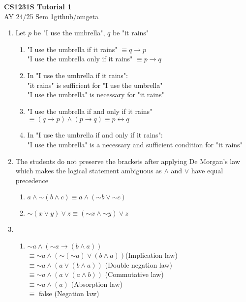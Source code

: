 \documentclass[12pt, a4paper]{article}
\newcommand{\mytitle}{CS1231S Tutorial 1}
\newcommand{\myauthor}{github/omgeta}
\newcommand{\mydate}{AY 24/25 Sem 1}
\begin{document}
\raggedright
\footnotesize
\begin{center}
{\normalsize{\textbf{\mytitle}}} \\
{\footnotesize{\mydate\hspace{2pt}\textemdash\hspace{2pt}\myauthor}}
\end{center}
\renewcommand{\neg}{\mathord{\sim}}
\begin{enumerate}[Q\arabic*.]
  \item Let $p$ be "I use the umbrella", $q$ be "it rains"
  \begin{enumerate}[(\alph*)]
    \item "I use the umbrella if it rains" $\equiv q \rightarrow p$ \\
      "I use the umbrella only if it rains" $\equiv p \rightarrow q$
    \item In "I use the umbrella if it rains": \\
      "it rains" is sufficient for "I use the umbrella" \\
      "I use the umbrella" is necessary for "it rains"
    \item "I use the umbrella if and only if it rains"$\equiv (q \rightarrow p) \land (p \rightarrow q) \equiv p \leftrightarrow q$
    \item In "I use the umbrella if and only if it rains": \\
      "I use the umbrella" is a necessary and sufficient condition for "it rains"
  \end{enumerate}

  \item The students do not preserve the brackets after applying De Morgan's law which makes the logical statement ambiguous as $\land$ and $\lor$ have equal precedence
    \begin{enumerate}[(\alph*)]
      \item $a \land \neg(b\land c) \equiv a \land (\neg b \lor \neg c)$ 
      \item $\neg(x \lor y) \lor z \equiv (\neg x \land \neg y) \lor z$ 
    \end{enumerate}

  \item
    \begin{enumerate}[(\alph*)]
      \item $\neg a \land (\neg a \rightarrow (b \land a))$\\
      $\equiv \neg a \land (\neg (\neg a) \lor (b \land a))$\hfill(Implication law)\\
      $\equiv \neg a \land (a \lor (b \land a))$ \hfill (Double negation law)\\
      $\equiv \neg a \land (a \lor (a \land b))$ \hfill (Commutative law)\\
      $\equiv \neg a \land (a)$ \hfill (Absorption law)\\
      $\equiv$ false \hfill (Negation law)\\


\end{enumerate}
\end{enumerate}
\end{document}
